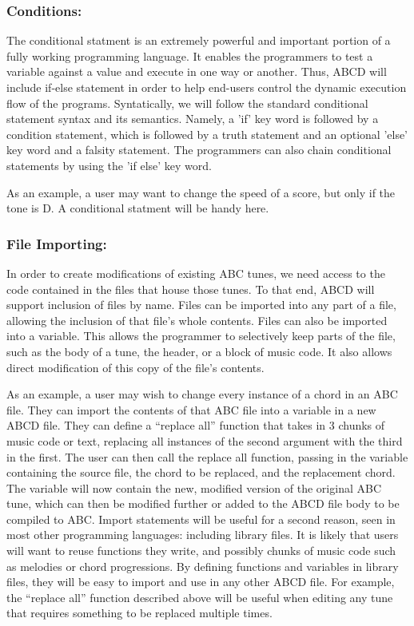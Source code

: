	\subsubsection{Conditions:}
		The conditional statment is an extremely powerful and important portion of a fully working programming language. It enables the programmers to test a variable against a value and execute in one way or another. Thus, ABCD will include if-else statement in order to help end-users control the dynamic execution flow of the programs. Syntatically, we will follow the standard conditional statement syntax and its semantics. Namely, a 'if' key word is followed by a condition statement, which is followed by a truth statement and an optional 'else' key word and a falsity statement. The programmers can also chain conditional statements by using the 'if else' key word.

		As an example, a user may want to change the speed of a score, but only if the tone is D. A conditional statment will be handy here.
	\subsubsection{File Importing:}
	In order to create modifications of existing ABC tunes, we need access to the code contained in the files that house those tunes. To that end, ABCD will support inclusion of files by name. Files can be imported into any part of a file, allowing the inclusion of that file's whole contents. Files can also be imported into a variable. This allows the programmer to selectively keep parts of the file, such as the body of a tune, the header, or a block of music code. It also allows direct modification of this copy of the file's contents. 
	
	As an example, a user may wish to change every instance of a chord in an ABC file. They can import the contents of that ABC file into a variable in a new ABCD file. They can define a “replace all” function that takes in 3 chunks of music code or text, replacing all instances of the second argument with the third in the first. The user can then call the replace all function, passing in the variable containing the source file, the chord to be replaced, and the replacement chord. The variable will now contain the new, modified version of the original ABC tune, which can then be modified further or added to the ABCD file body to be compiled to ABC.
	Import statements will be useful for a second reason, seen in most other programming languages: including library files. It is likely that users will want to reuse functions they write, and possibly chunks of music code such as melodies or chord progressions. By defining functions and variables in library files, they will be easy to import and use in any other ABCD file. For example, the “replace all” function described above will be useful when editing any tune that requires something to be replaced multiple times.
	
